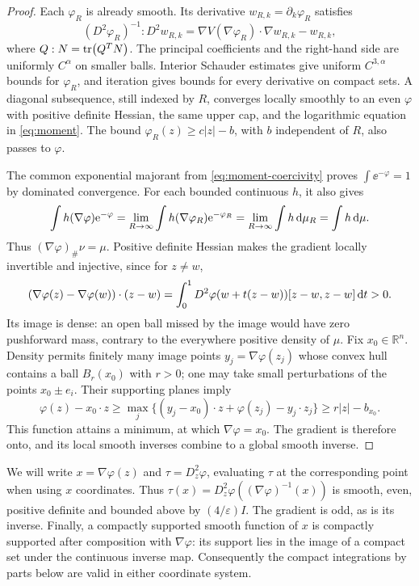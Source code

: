 \begin{proof}
Each $\varphi_R$ is already smooth.  Its derivative $w_{R,k}=\partial_k\varphi_R$ satisfies
\[
 (D^2\varphi_R)^{-1}:D^2w_{R,k}
   =\nabla V(\nabla\varphi_R)\cdot\nabla w_{R,k}-w_{R,k},
\]
where $Q:N=\tr(Q^TN)$.  The principal coefficients and the right-hand side are uniformly $C^\alpha$ on smaller balls. Interior Schauder estimates \cite[Theorem~2.20 and Corollary~2.21]{FernandezRealRosOton2022} give uniform $C^{3,\alpha}$ bounds for $\varphi_R$, and iteration gives bounds for every derivative on compact sets. A diagonal subsequence, still indexed by $R$, converges locally smoothly to an even $\varphi$ with positive definite Hessian, the same upper cap, and the logarithmic equation in \eqref{eq:moment}. The bound $\varphi_R(z)\ge c|z|-b$, with $b$ independent of $R$, also passes to $\varphi$.

The common exponential majorant from \eqref{eq:moment-coercivity} proves $\int \ee^{-\varphi}=1$ by dominated convergence.  For each bounded continuous $h$, it also gives
\[
 \int h(\nabla\varphi)\mathrm{e}^{-\varphi}
 =\lim_{R\to\infty}\int h(\nabla\varphi_R)\mathrm{e}^{-\varphi_R}
 =\lim_{R\to\infty}\int h\,\mathrm{d} \mu_R
 =\int h\,\mathrm{d} \mu.
\]
Thus $(\nabla\varphi)_\#\nu=\mu$. Positive definite Hessian makes the gradient locally invertible and injective, since for $z\ne w$,
\[
 (\nabla\varphi(z)-\nabla\varphi(w))\cdot(z-w)
 =\int_0^1 D^2\varphi(w+t(z-w))[z-w,z-w]\,\mathrm{d} t>0.
\]
Its image is dense: an open ball missed by the image would have zero pushforward mass, contrary to the everywhere positive density of $\mu$.  Fix $x_0\in\mathbb{R}^n$.  Density permits finitely many image points $y_j=\nabla\varphi(z_j)$ whose convex hull contains a ball $B_r(x_0)$ with $r>0$; one may take small perturbations of the points $x_0\pm e_i$.  Their supporting planes imply
\[
 \varphi(z)-x_0\cdot z
 \ge\max_j\{(y_j-x_0)\cdot z+\varphi(z_j)-y_j\cdot z_j\}
 \ge r|z|-b_{x_0}.
\]
This function attains a minimum, at which $\nabla\varphi=x_0$.  The gradient is therefore onto, and its local smooth inverses combine to a global smooth inverse.
\end{proof}

We will write $x=\nabla\varphi(z)$ and $\tau=D_z^2\varphi$, evaluating $\tau$ at the corresponding point when using $x$ coordinates.  Thus $\tau(x)=D_z^2\varphi((\nabla\varphi)^{-1}(x))$ is smooth, even, positive definite and bounded above by $(4/\varepsilon)I$. The gradient is odd, as is its inverse.  Finally, a compactly supported smooth function of $x$ is compactly supported after composition with $\nabla\varphi$: its support lies in the image of a compact set under the continuous inverse map.  Consequently the compact integrations by parts below are valid in either coordinate system.
